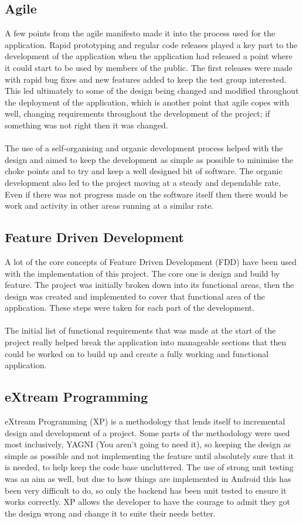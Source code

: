 \subsection{Agile}

A few points from the agile manifesto made it into the process used for the application. Rapid prototyping and regular code releases played a key part to the development of the application when the application had released a point where it could start to be used by members of the public. The first releases were made with rapid bug fixes and new features added to keep the test group interested. This led ultimately to some of the design being changed and modified throughout the deployment of the application, which is another point that agile copes with well, changing requirements throughout the development of the project; if something was not right then it was changed.\\
\\
The use of a self-organising and organic development process helped with the design and aimed to keep the development as simple as possible to minimise the choke points and to try and keep a well designed bit of software. The organic development also led to the project moving at a steady and dependable rate. Even if there was not progress made on the software itself then there would be work and activity in other areas running at a similar rate.

\subsection{Feature Driven Development}

A lot of the core concepts of Feature Driven Development (FDD) have been used with the implementation of this project. The core one is design and build by feature. The project was initially broken down into its functional areas, then the design was created and implemented to cover that functional area of the application. These steps were taken for each part of the development.\\
\\
The initial list of functional requirements that was made at the start of the project really helped break the application into manageable sections that then could be worked on to build up and create a fully working and functional application.

\subsection{eXtream Programming}

eXtream Programming (XP) is a methodology that lends itself to incremental design and development of a project. Some parts of the methodology were used most inclusively, YAGNI (You aren't going to need it), so keeping the design as simple as possible and not implementing the feature until absolutely sure that it is needed, to help keep the code base uncluttered. The use of strong unit testing was an aim as well, but due to how things are implemented in Android this has been very difficult to do, so only the backend has been unit tested to ensure it works correctly. XP allows the developer to have the courage to admit they got the design wrong and change it to suite their needs better.